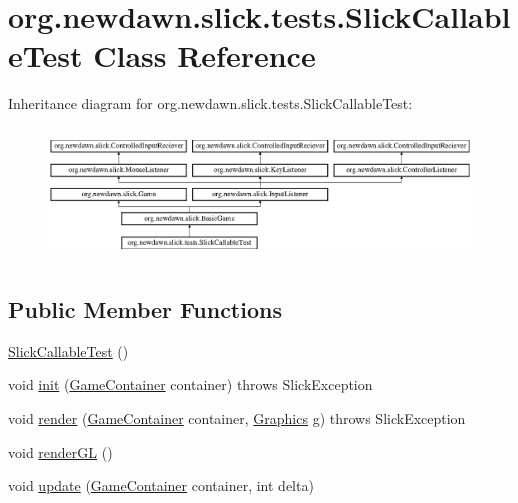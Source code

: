 \hypertarget{classorg_1_1newdawn_1_1slick_1_1tests_1_1_slick_callable_test}{}\section{org.\+newdawn.\+slick.\+tests.\+Slick\+Callable\+Test Class Reference}
\label{classorg_1_1newdawn_1_1slick_1_1tests_1_1_slick_callable_test}
Inheritance diagram for org.\+newdawn.\+slick.\+tests.\+Slick\+Callable\+Test\+:\begin{figure}[H]
\begin{center}
\leavevmode
\includegraphics[height=3.522012cm]{classorg_1_1newdawn_1_1slick_1_1tests_1_1_slick_callable_test}
\end{center}
\end{figure}
\subsection*{Public Member Functions}
\begin{DoxyCompactItemize}
\item 
\mbox{\hyperlink{classorg_1_1newdawn_1_1slick_1_1tests_1_1_slick_callable_test_aa814ea910d589fd1b68da7138cae4d16}{Slick\+Callable\+Test}} ()
\item 
void \mbox{\hyperlink{classorg_1_1newdawn_1_1slick_1_1tests_1_1_slick_callable_test_a5f54cf637de462ca508811398a0f92ae}{init}} (\mbox{\hyperlink{classorg_1_1newdawn_1_1slick_1_1_game_container}{Game\+Container}} container)  throws Slick\+Exception 
\item 
void \mbox{\hyperlink{classorg_1_1newdawn_1_1slick_1_1tests_1_1_slick_callable_test_aa0fe58472a8a6a8a9551182039368ef2}{render}} (\mbox{\hyperlink{classorg_1_1newdawn_1_1slick_1_1_game_container}{Game\+Container}} container, \mbox{\hyperlink{classorg_1_1newdawn_1_1slick_1_1_graphics}{Graphics}} g)  throws Slick\+Exception 
\item 
void \mbox{\hyperlink{classorg_1_1newdawn_1_1slick_1_1tests_1_1_slick_callable_test_a254f1f38833563398a4e00a8360ffebd}{render\+GL}} ()
\item 
void \mbox{\hyperlink{classorg_1_1newdawn_1_1slick_1_1tests_1_1_slick_callable_test_a8ba69f4047784e9a9778f20b467729b8}{update}} (\mbox{\hyperlink{classorg_1_1newdawn_1_1slick_1_1_game_container}{Game\+Container}} container, int delta)
\end{DoxyCompactItemize}
